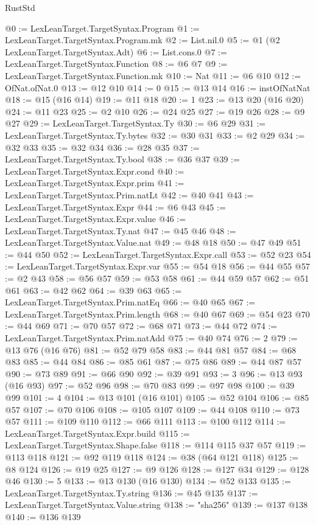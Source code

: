 \begin{lexlean}{RustStd}
\begin{coremodule}
@0 := LexLeanTarget.TargetSyntax.Program
@1 := LexLeanTarget.TargetSyntax.Program.mk
@2 := List.nil.{0}
@5 := @1 (@2 LexLeanTarget.TargetSyntax.Adt)
@6 := List.cons.{0}
@7 := LexLeanTarget.TargetSyntax.Function
@8 := @6 @7
@9 := LexLeanTarget.TargetSyntax.Function.mk
@10 := Nat
@11 := @6 @10
@12 := OfNat.ofNat.{0}
@13 := @12 @10
@14 := 0
@15 := @13 @14
@16 := instOfNatNat
@18 := @15 (@16 @14)
@19 := @11 @18
@20 := 1
@23 := @13 @20 (@16 @20)
@24 := @11 @23
@25 := @2 @10
@26 := @24 @25
@27 := @19 @26
@28 := @9 @27
@29 := LexLeanTarget.TargetSyntax.Ty
@30 := @6 @29
@31 := LexLeanTarget.TargetSyntax.Ty.bytes
@32 := @30 @31
@33 := @2 @29
@34 := @32 @33
@35 := @32 @34
@36 := @28 @35
@37 := LexLeanTarget.TargetSyntax.Ty.bool
@38 := @36 @37
@39 := LexLeanTarget.TargetSyntax.Expr.cond
@40 := LexLeanTarget.TargetSyntax.Expr.prim
@41 := LexLeanTarget.TargetSyntax.Prim.natLt
@42 := @40 @41
@43 := LexLeanTarget.TargetSyntax.Expr
@44 := @6 @43
@45 := LexLeanTarget.TargetSyntax.Expr.value
@46 := LexLeanTarget.TargetSyntax.Ty.nat
@47 := @45 @46
@48 := LexLeanTarget.TargetSyntax.Value.nat
@49 := @48 @18
@50 := @47 @49
@51 := @44 @50
@52 := LexLeanTarget.TargetSyntax.Expr.call
@53 := @52 @23
@54 := LexLeanTarget.TargetSyntax.Expr.var
@55 := @54 @18
@56 := @44 @55
@57 := @2 @43
@58 := @56 @57
@59 := @53 @58
@61 := @44 @59 @57
@62 := @51 @61
@63 := @42 @62
@64 := @39 @63
@65 := LexLeanTarget.TargetSyntax.Prim.natEq
@66 := @40 @65
@67 := LexLeanTarget.TargetSyntax.Prim.length
@68 := @40 @67
@69 := @54 @23
@70 := @44 @69
@71 := @70 @57
@72 := @68 @71
@73 := @44 @72
@74 := LexLeanTarget.TargetSyntax.Prim.natAdd
@75 := @40 @74
@76 := 2
@79 := @13 @76 (@16 @76)
@81 := @52 @79 @58
@83 := @44 @81 @57
@84 := @68 @83
@85 := @44 @84
@86 := @85 @61
@87 := @75 @86
@89 := @44 @87 @57
@90 := @73 @89
@91 := @66 @90
@92 := @39 @91
@93 := 3
@96 := @13 @93 (@16 @93)
@97 := @52 @96
@98 := @70 @83
@99 := @97 @98
@100 := @39 @99
@101 := 4
@104 := @13 @101 (@16 @101)
@105 := @52 @104
@106 := @85 @57
@107 := @70 @106
@108 := @105 @107
@109 := @44 @108
@110 := @73 @57
@111 := @109 @110
@112 := @66 @111
@113 := @100 @112
@114 := LexLeanTarget.TargetSyntax.Expr.build
@115 := LexLeanTarget.TargetSyntax.Shape.false
@118 := @114 @115 @37 @57
@119 := @113 @118
@121 := @92 @119 @118
@124 := @38 (@64 @121 @118)
@125 := @8 @124
@126 := @19 @25
@127 := @9 @126
@128 := @127 @34
@129 := @128 @46
@130 := 5
@133 := @13 @130 (@16 @130)
@134 := @52 @133
@135 := LexLeanTarget.TargetSyntax.Ty.string
@136 := @45 @135
@137 := LexLeanTarget.TargetSyntax.Value.string
@138 := "sha256"
@139 := @137 @138
@140 := @136 @139

\end{coremodule}
\end{lexlean}
